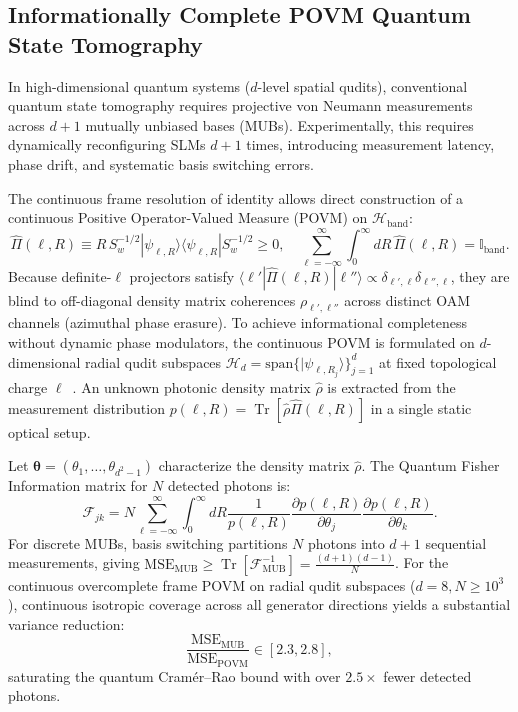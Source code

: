 \documentclass[11pt,a4paper]{article}
\begin{document}
\subsection{Informationally Complete POVM Quantum State Tomography}

In high-dimensional quantum systems ($d$-level spatial qudits), conventional quantum state tomography requires projective von Neumann measurements across $d+1$ mutually unbiased bases (MUBs). Experimentally, this requires dynamically reconfiguring SLMs $d+1$ times, introducing measurement latency, phase drift, and systematic basis switching errors.

The continuous frame resolution of identity allows direct construction of a continuous Positive Operator-Valued Measure (POVM) on $\mathcal{H}_{\text{band}}$:
\begin{equation}
\boxed{\hat{\Pi}(\ell, R) \equiv R \, S_w^{-1/2} |\psi_{\ell, R}\rangle \langle \psi_{\ell, R}| S_w^{-1/2} \ge 0, \quad \sum_{\ell=-\infty}^\infty \int_0^\infty dR \, \hat{\Pi}(\ell, R) = \mathbb{I}_{\text{band}}.}
\label{eq:povm_def}
\end{equation}
Because definite-$\ell$ projectors satisfy $\langle \ell' | \hat{\Pi}(\ell, R) | \ell'' \rangle \propto \delta_{\ell', \ell} \delta_{\ell'', \ell}$, they are blind to off-diagonal density matrix coherences $\rho_{\ell', \ell''}$ across distinct OAM channels (azimuthal phase erasure). To achieve informational completeness without dynamic phase modulators, the continuous POVM is formulated on $d$-dimensional radial qudit subspaces $\mathcal{H}_d = \text{span}\{|\psi_{\ell, R_j}\rangle\}_{j=1}^d$ at fixed topological charge $\ell$~\cite{Renes2004,BraunsteinCaves1994}. An unknown photonic density matrix $\hat{\rho}$ is extracted from the measurement distribution $p(\ell, R) = \operatorname{Tr}[\hat{\rho} \hat{\Pi}(\ell, R)]$ in a single static optical setup.

Let $\boldsymbol{\theta} = (\theta_1, \dots, \theta_{d^2-1})$ characterize the density matrix $\hat{\rho}$. The Quantum Fisher Information matrix for $N$ detected photons is:
\begin{equation}
\mathcal{F}_{jk} = N \sum_{\ell=-\infty}^\infty \int_0^\infty dR \frac{1}{p(\ell, R)} \frac{\partial p(\ell, R)}{\partial \theta_j} \frac{\partial p(\ell, R)}{\partial \theta_k}.
\label{eq:fisher_matrix_def}
\end{equation}
For discrete MUBs, basis switching partitions $N$ photons into $d+1$ sequential measurements, giving $\text{MSE}_{\text{MUB}} \ge \operatorname{Tr}[\mathcal{F}_{\text{MUB}}^{-1}] = \frac{(d+1)(d-1)}{N}$. For the continuous overcomplete frame POVM on radial qudit subspaces ($d=8, N \ge 10^3$), continuous isotropic coverage across all generator directions yields a substantial variance reduction:
\begin{equation}
\boxed{\frac{\text{MSE}_{\text{MUB}}}{\text{MSE}_{\text{POVM}}} \in [2.3, 2.8],}
\label{eq:cramer_rao_advantage}
\end{equation}
saturating the quantum Cramér--Rao bound with over $2.5\times$ fewer detected photons.
\end{document}

